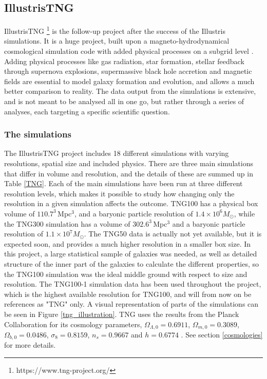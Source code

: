 \subsection{IllustrisTNG}
IllustrisTNG \footnote{https://www.tng-project.org/} is the follow-up project after the success of the Illustris simulations. It is a huge project, built upon a magneto-hydrodynamical cosmological simulation code with added physical processes on a subgrid level \parencite{Weinberger2016}. Adding physical processes like gas radiation, star formation, stellar feedback through supernova explosions, supermassive black hole accretion and magnetic fields are essential to model galaxy formation and evolution, and allows a much better comparison to reality. The data output from the simulations is extensive, and is not meant to be analysed all in one go, but rather through a series of analyses, each targeting a specific scientific question. 


\subsubsection{The simulations}
The IllustrisTNG project includes 18 different simulations with varying resolutions, spatial size and included physics. There are three main simulations that differ in volume and resolution, and the details of these are summed up in Table \ref{TNG}. Each of the main simulations have been run at three different resolution levels, which makes it possible to study how changing only the resolution in a given simulation affects the outcome. TNG100 has a physical box volume of $110.7^3 \, $Mpc$^3$, and a baryonic particle resolution of $1.4 \times 10^6 M_{\odot}$, while the TNG300 simulation has a volume of $302.6^3 \, $Mpc$^3$ and a baryonic particle resolution of $1.1 \times 10^7 M_{\odot}$. The TNG50 data is actually not yet available, but it is expected soon, and provides a much higher resolution in a smaller box size. In this project, a large statistical sample of galaxies was needed, as well as detailed structure of the inner part of the galaxies to calculate the different properties, so the TNG100 simulation was the ideal middle ground with respect to size and resolution. The TNG100-1 simulation data has been used throughout the project, which is the highest available resolution for TNG100, and will from now on be references as "TNG" only. A visual representation of parts of the simulations can be seen in Figure \ref{tng_illustration}. TNG uses the results from the Planck Collaboration for its cosmology parameters, $\Omega_{\Lambda,0} = 0.6911$, $\Omega_{m,0}=0.3089$, $\Omega_{b,0}=0.0486$, $\sigma_8=0.8159$, $n_s=0.9667$ and $h = 0.6774$ \parencite{Planck2015}. See section \ref{cosmologies} for more details.

